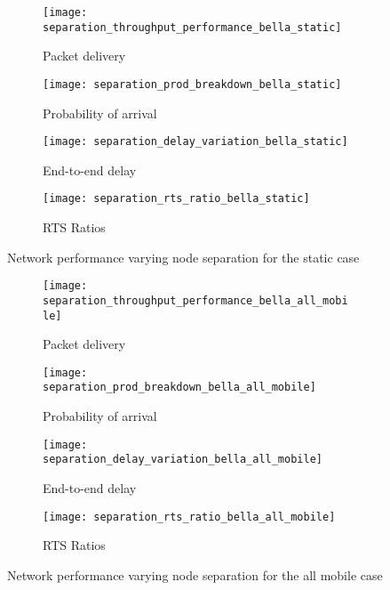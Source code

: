 \begin{figure}[tp!]
	\begin{subfigure}[t]{0.5\textwidth}
		\centering
		\texttt{[image: separation\_throughput\_performance\_bella\_static]}
		\caption{Packet delivery}
		\label{fig:separation_throughput_performance_bella_static}
	\end{subfigure}
	\begin{subfigure}[t]{0.5\textwidth}
		\centering
		\texttt{[image: separation\_prod\_breakdown\_bella\_static]}
		\caption{Probability of arrival}
		\label{fig:separation_prod_breakdown_bella_static}
	\end{subfigure}
	
	\begin{subfigure}[t]{0.5\textwidth}
		\centering
		\texttt{[image: separation\_delay\_variation\_bella\_static]}
		\caption{End-to-end delay}
		\label{fig:separation_delay_variation_bella_static}
	\end{subfigure}
	\begin{subfigure}[t]{0.5\textwidth}
		\centering
		\texttt{[image: separation\_rts\_ratio\_bella\_static]}
		\caption{RTS Ratios}
		\label{fig:separation_rts_ratio_bella_static}
	\end{subfigure}
	\caption{Network performance varying node separation for the static case}
	\label{fig:separation_bella_static}
\end{figure}


\begin{figure}[bp!]
	\begin{subfigure}[t]{0.5\textwidth}
		\centering
		\texttt{[image: separation\_throughput\_performance\_bella\_all\_mobile]}
		\caption{Packet delivery}
		\label{fig:separation_throughput_performance_bella_all_mobile}
	\end{subfigure}
	\begin{subfigure}[t]{0.5\textwidth}
		\centering
		\texttt{[image: separation\_prod\_breakdown\_bella\_all\_mobile]}
		\caption{Probability of arrival}
		\label{fig:separation_prod_breakdown_bella_all_mobile}
	\end{subfigure}
	
	\begin{subfigure}[t]{0.5\textwidth}
		\centering
		\texttt{[image: separation\_delay\_variation\_bella\_all\_mobile]}
		\caption{End-to-end delay}
		\label{fig:separation_delay_variation_bella_all_mobile}
	\end{subfigure}
	\begin{subfigure}[t]{0.5\textwidth}
		\centering
		\texttt{[image: separation\_rts\_ratio\_bella\_all\_mobile]}
		\caption{RTS Ratios}
		\label{fig:separation_rts_ratio_bella_all_mobile}
	\end{subfigure}
	\caption{Network performance varying node separation for the all mobile case}
	\label{fig:separation_bella_all_mobile}
\end{figure}


